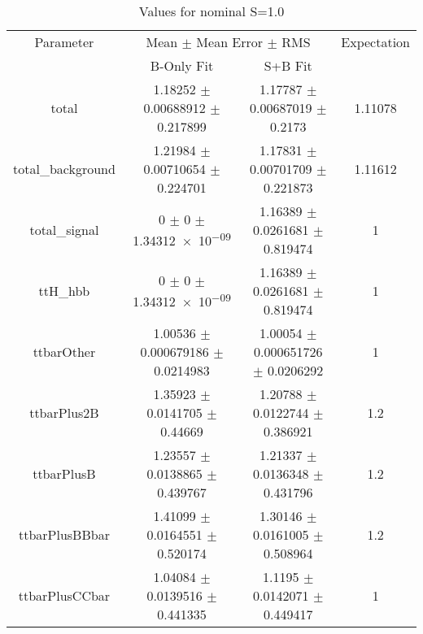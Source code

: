 \begin{table}
\centering
\caption{Values for nominal S=1.0}
\begin{tabular}{cccc}
\toprule
Parameter & \multicolumn{2}{c}{Mean $\pm$ Mean Error $\pm$ RMS} & Expectation\\
 & B-Only Fit & S+B Fit & \\
\midrule
total & \num{1.18252} $\pm$ \num{0.00688912} $\pm$ \num{0.217899} & \num{1.17787} $\pm$ \num{0.00687019} $\pm$ \num{0.2173} & \num{1.11078}\\
total\_background & \num{1.21984} $\pm$ \num{0.00710654} $\pm$ \num{0.224701} & \num{1.17831} $\pm$ \num{0.00701709} $\pm$ \num{0.221873} & \num{1.11612}\\
total\_signal & \num{0} $\pm$ \num{0} $\pm$ \num{1.34312e-09} & \num{1.16389} $\pm$ \num{0.0261681} $\pm$ \num{0.819474} & \num{1}\\
ttH\_hbb & \num{0} $\pm$ \num{0} $\pm$ \num{1.34312e-09} & \num{1.16389} $\pm$ \num{0.0261681} $\pm$ \num{0.819474} & \num{1}\\
ttbarOther & \num{1.00536} $\pm$ \num{0.000679186} $\pm$ \num{0.0214983} & \num{1.00054} $\pm$ \num{0.000651726} $\pm$ \num{0.0206292} & \num{1}\\
ttbarPlus2B & \num{1.35923} $\pm$ \num{0.0141705} $\pm$ \num{0.44669} & \num{1.20788} $\pm$ \num{0.0122744} $\pm$ \num{0.386921} & \num{1.2}\\
ttbarPlusB & \num{1.23557} $\pm$ \num{0.0138865} $\pm$ \num{0.439767} & \num{1.21337} $\pm$ \num{0.0136348} $\pm$ \num{0.431796} & \num{1.2}\\
ttbarPlusBBbar & \num{1.41099} $\pm$ \num{0.0164551} $\pm$ \num{0.520174} & \num{1.30146} $\pm$ \num{0.0161005} $\pm$ \num{0.508964} & \num{1.2}\\
ttbarPlusCCbar & \num{1.04084} $\pm$ \num{0.0139516} $\pm$ \num{0.441335} & \num{1.1195} $\pm$ \num{0.0142071} $\pm$ \num{0.449417} & \num{1}\\
\bottomrule
\end{tabular}
\end{table}